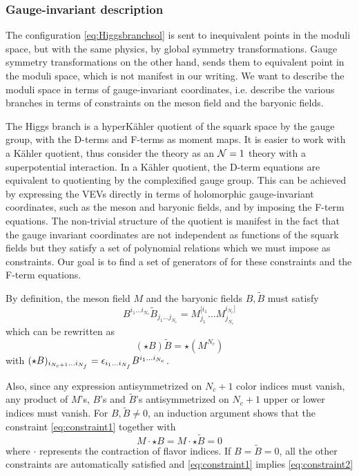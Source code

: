         \subsubsection{Gauge-invariant description}

            The configuration \eqref{eq:Higgsbranchsol} is sent to inequivalent points in the moduli space, but with the same physics, by global symmetry transformations. Gauge symmetry transformations on the other hand, sends them to equivalent point in the moduli space, which is not manifest in our writing. We want to describe the moduli space in terms of gauge-invariant coordinates, i.e. describe the various branches in terms of constraints on the meson field and the baryonic fields.

            The Higgs branch is a hyperKähler quotient of the squark space by the gauge group, with the D-terms and F-terms as moment maps. It is easier to work with a Kähler quotient, thus consider the theory as an $\mathcal{N}=1$ theory with a superpotential interaction. In a Kähler quotient, the D-term equations are equivalent to quotienting by the complexified gauge group. This can be achieved by expressing the VEVs directly in terms of holomorphic gauge-invariant coordinates, such as the meson and baryonic fields, and by imposing the F-term equations. The non-trivial structure of the quotient is manifest in the fact that the gauge invariant coordinates are not independent as functions of the squark fields but they satisfy a set of polynomial relations which we must impose as constraints. Our goal is to find a set of generators of for these constraints and the F-term equations.

            By definition, the meson field $M$ and the baryonic fields $B,\tilde{B}$ must satisfy
            \begin{equation}
                B^{i_1\dots i_{N_c}}\tilde{B}_{j_1\dots j_{N_c}}=M^{[i_1}_{j_1}\dots M^{i_{N_c}]}_{j_{N_c}}
            \end{equation}
            which can be rewritten as
            \begin{equation}
                (\star B)\tilde{B}=\star(M^{N_c})\label{eq:constraint1}
            \end{equation}
            with $(\star B)_{i_{N_c+1}\dots i_{N_f}}=\epsilon_{i_1\dots i_{N_f}}B^{i_1\dots i_{N_c}}$.
            
            Also, since any expression antisymmetrized on $N_c+1$ color indices must vanish, any product of $M$'s, $B$'s and $\tilde{B}$'s antisymmetrized on $N_c+1$ upper or lower indices must vanish. For $B,\tilde{B}\neq0$, an induction argument shows that the constraint \eqref{eq:constraint1} together with
            \begin{equation}
                M\cdot\star B=M\cdot\star\tilde{B}=0\label{eq:constraint2}
            \end{equation}
            where $\cdot$ represents the contraction of flavor indices. If $B=\tilde{B}=0$, all the other constraints are automatically satisfied and \eqref{eq:constraint1} implies \eqref{eq:constraint2}

